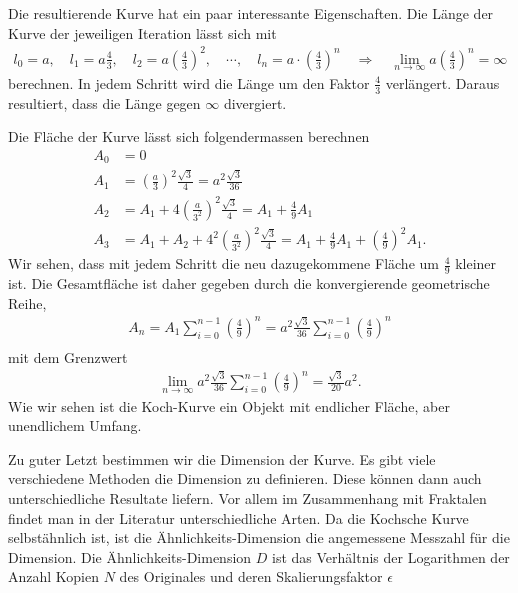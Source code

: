Die resultierende Kurve hat ein paar interessante Eigenschaften.
Die Länge der Kurve der jeweiligen Iteration lässt sich mit 
\begin{align*}
	l_0 = a ,\quad l_1 = a  \frac{4}{3} ,\quad l_2 = a  \left( \frac{4}{3}\right)^2 , \quad \cdots , \quad
	l_n = a \cdot \left( \frac{4}{3}\right)^n \quad
	\Rightarrow \quad
	\lim_{n\to\infty} a  \left( \frac{4}{3}\right)^n = \infty
\end{align*}
berechnen.
In jedem Schritt wird die Länge um den Faktor $\frac{4}{3}$ verlängert. Daraus resultiert, dass die Länge gegen $\infty$ divergiert. 


Die Fläche der Kurve lässt sich folgendermassen berechnen
\begin{align*}
	A_0 &= 0 \\
	A_1 &= \left( \frac{a}{3}\right)^2 \frac{\sqrt{3}}{4} = a^2 \frac{\sqrt{3}}{36}\\
	A_2 &= A_1 + 4\left( \frac{a}{3^2}\right)^2 \frac{\sqrt{3}}{4} = A_1 + \frac{4}{9} A_1 \\ 
	A_3 &= A_1 + A_2 + 4^2 \left( \frac{a}{3^2}\right)^2 \frac{\sqrt{3}}{4} = A_1 + \frac{4}{9} A_1 + \left( \frac{4}{9}\right)^2 A_1.
\end{align*}
Wir sehen, dass mit jedem Schritt die neu dazugekommene Fläche um $\frac{4}{9}$ kleiner ist.
Die Gesamtfläche ist daher gegeben durch die konvergierende geometrische Reihe,
\begin{align*}
	A_n = A_1 \sum_{i = 0}^{n-1} \left( \frac{4}{9}\right)^n =  a^2 \frac{\sqrt{3}}{36} \sum_{i = 0}^{n-1} \left( \frac{4}{9}\right)^n \\
\end{align*}
mit dem Grenzwert
\begin{align*}
	\lim_{n\to\infty} a^2 \frac{\sqrt{3}}{36} \sum_{i = 0}^{n-1} \left( \frac{4}{9}\right)^n = \frac{\sqrt{3}}{20} a^2. 
\end{align*}
Wie wir sehen ist die Koch-Kurve ein Objekt mit endlicher Fläche, aber unendlichem Umfang.


Zu guter Letzt bestimmen wir die Dimension der Kurve. 
Es gibt viele verschiedene Methoden die Dimension zu definieren. Diese können dann auch unterschiedliche Resultate liefern.
Vor allem im Zusammenhang mit Fraktalen findet man in der Literatur unterschiedliche Arten.
Da die Kochsche Kurve selbstähnlich ist, ist die Ähnlichkeits-Dimension \cite{ifs:fractal-geometry} die angemessene Messzahl für die Dimension.
Die Ähnlichkeits-Dimension $D$ ist das Verhältnis der Logarithmen der Anzahl Kopien $N$ des Originales und deren Skalierungsfaktor $\epsilon$
  
